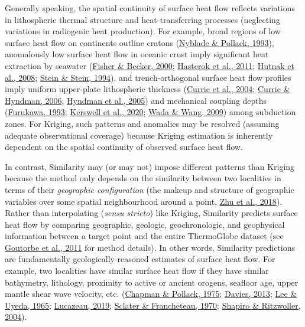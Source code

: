 Generally speaking, the spatial continuity of surface heat flow reflects variations in lithospheric thermal structure and heat-transferring processes (neglecting variations in radiogenic heat production). For example, broad regions of low surface heat flow on continents outline cratons (\protect\hyperlink{ref-nyblade1993}{Nyblade \& Pollack, 1993}), anomalously low surface heat flow in oceanic crust imply significant heat extraction by seawater (\protect\hyperlink{ref-fisher2000}{Fisher \& Becker, 2000}; \protect\hyperlink{ref-hasterok2011}{Hasterok et al., 2011}; \protect\hyperlink{ref-hutnak2008}{Hutnak et al., 2008}; \protect\hyperlink{ref-stein1994}{Stein \& Stein, 1994}), and trench-orthogonal surface heat flow profiles imply uniform upper-plate lithospheric thickness (\protect\hyperlink{ref-currie2004}{Currie et al., 2004}; \protect\hyperlink{ref-currie2006}{Currie \& Hyndman, 2006}; \protect\hyperlink{ref-hyndman2005}{Hyndman et al., 2005}) and mechanical coupling depths (\protect\hyperlink{ref-furukawa1993}{Furukawa, 1993}; \protect\hyperlink{ref-kerswell2020}{Kerswell et al., 2020}; \protect\hyperlink{ref-wada2009}{Wada \& Wang, 2009}) among subduction zones. For Kriging, such patterns and anomalies may be resolved (assuming adequate observational coverage) because Kriging estimation is inherently dependent on the spatial continuity of observed surface heat flow.

In contrast, Similarity may (or may not) impose different patterns than Kriging because the method only depends on the similarity between two localities in terms of their \emph{geographic configuration} (the makeup and structure of geographic variables over some spatial neighbourhood around a point, \protect\hyperlink{ref-zhu2018}{Zhu et al., 2018}). Rather than interpolating (\emph{sensu stricto}) like Kriging, Similarity predicts surface heat flow by comparing geographic, geologic, geochronologic, and geophysical information between a target point and the entire ThermoGlobe dataset (see \protect\hyperlink{ref-goutorbe2011}{Goutorbe et al., 2011} for method details). In other words, Similarity predictions are fundamentally geologically-reasoned estimates of surface heat flow. For example, two localities have similar surface heat flow if they have similar bathymetry, lithology, proximity to active or ancient orogens, seafloor age, upper mantle shear wave velocity, etc. (\protect\hyperlink{ref-chapman1975}{Chapman \& Pollack, 1975}; \protect\hyperlink{ref-davies2013}{Davies, 2013}; \protect\hyperlink{ref-lee1965}{Lee \& Uyeda, 1965}; \protect\hyperlink{ref-lucazeau2019}{Lucazeau, 2019}; \protect\hyperlink{ref-sclater1970}{Sclater \& Francheteau, 1970}; \protect\hyperlink{ref-shapiro2004}{Shapiro \& Ritzwoller, 2004}).

